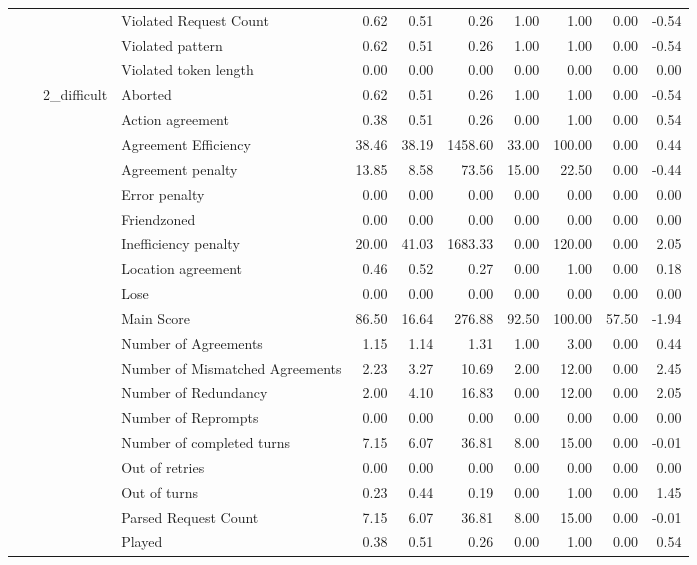 \begin{tabular}{llllrrrrrrr}
 &  &  & Violated Request Count & 0.62 & 0.51 & 0.26 & 1.00 & 1.00 & 0.00 & -0.54 \\
 &  &  & Violated pattern & 0.62 & 0.51 & 0.26 & 1.00 & 1.00 & 0.00 & -0.54 \\
 &  &  & Violated token length & 0.00 & 0.00 & 0.00 & 0.00 & 0.00 & 0.00 & 0.00 \\
\cline{3-11}
 &  & \multirow[t]{27}{*}{2_difficult} & Aborted & 0.62 & 0.51 & 0.26 & 1.00 & 1.00 & 0.00 & -0.54 \\
 &  &  & Action agreement & 0.38 & 0.51 & 0.26 & 0.00 & 1.00 & 0.00 & 0.54 \\
 &  &  & Agreement Efficiency & 38.46 & 38.19 & 1458.60 & 33.00 & 100.00 & 0.00 & 0.44 \\
 &  &  & Agreement penalty & 13.85 & 8.58 & 73.56 & 15.00 & 22.50 & 0.00 & -0.44 \\
 &  &  & Error penalty & 0.00 & 0.00 & 0.00 & 0.00 & 0.00 & 0.00 & 0.00 \\
 &  &  & Friendzoned & 0.00 & 0.00 & 0.00 & 0.00 & 0.00 & 0.00 & 0.00 \\
 &  &  & Inefficiency penalty & 20.00 & 41.03 & 1683.33 & 0.00 & 120.00 & 0.00 & 2.05 \\
 &  &  & Location agreement & 0.46 & 0.52 & 0.27 & 0.00 & 1.00 & 0.00 & 0.18 \\
 &  &  & Lose & 0.00 & 0.00 & 0.00 & 0.00 & 0.00 & 0.00 & 0.00 \\
 &  &  & Main Score & 86.50 & 16.64 & 276.88 & 92.50 & 100.00 & 57.50 & -1.94 \\
 &  &  & Number of Agreements & 1.15 & 1.14 & 1.31 & 1.00 & 3.00 & 0.00 & 0.44 \\
 &  &  & Number of Mismatched Agreements & 2.23 & 3.27 & 10.69 & 2.00 & 12.00 & 0.00 & 2.45 \\
 &  &  & Number of Redundancy & 2.00 & 4.10 & 16.83 & 0.00 & 12.00 & 0.00 & 2.05 \\
 &  &  & Number of Reprompts & 0.00 & 0.00 & 0.00 & 0.00 & 0.00 & 0.00 & 0.00 \\
 &  &  & Number of completed turns & 7.15 & 6.07 & 36.81 & 8.00 & 15.00 & 0.00 & -0.01 \\
 &  &  & Out of retries & 0.00 & 0.00 & 0.00 & 0.00 & 0.00 & 0.00 & 0.00 \\
 &  &  & Out of turns & 0.23 & 0.44 & 0.19 & 0.00 & 1.00 & 0.00 & 1.45 \\
 &  &  & Parsed Request Count & 7.15 & 6.07 & 36.81 & 8.00 & 15.00 & 0.00 & -0.01 \\
 &  &  & Played & 0.38 & 0.51 & 0.26 & 0.00 & 1.00 & 0.00 & 0.54 \\

\end{tabular}
